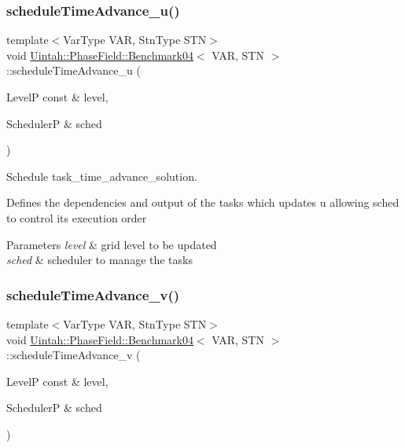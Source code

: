 \subsubsection{\texorpdfstring{schedule\+Time\+Advance\+\_\+u()}{scheduleTimeAdvance\_u()}}
{\footnotesize\ttfamily template$<$Var\+Type V\+AR, Stn\+Type S\+TN$>$ \\
void \hyperlink{classUintah_1_1PhaseField_1_1Benchmark04}{Uintah\+::\+Phase\+Field\+::\+Benchmark04}$<$ V\+AR, S\+TN $>$\+::schedule\+Time\+Advance\+\_\+u (\begin{DoxyParamCaption}\item[{LevelP const \&}]{level,  }\item[{SchedulerP \&}]{sched }\end{DoxyParamCaption})\hspace{0.3cm}{\ttfamily [protected]}}



Schedule task\+\_\+time\+\_\+advance\+\_\+solution. 

Defines the dependencies and output of the tasks which updates u allowing sched to control its execution order


\begin{DoxyParams}{Parameters}
{\em level} & grid level to be updated \\
\hline
{\em sched} & scheduler to manage the tasks \\
\hline
\end{DoxyParams}
\mbox{\label{classUintah_1_1PhaseField_1_1Benchmark04_af2af174a250e55c88d011aade126d709}} 
\subsubsection{\texorpdfstring{schedule\+Time\+Advance\+\_\+v()}{scheduleTimeAdvance\_v()}}
{\footnotesize\ttfamily template$<$Var\+Type V\+AR, Stn\+Type S\+TN$>$ \\
void \hyperlink{classUintah_1_1PhaseField_1_1Benchmark04}{Uintah\+::\+Phase\+Field\+::\+Benchmark04}$<$ V\+AR, S\+TN $>$\+::schedule\+Time\+Advance\+\_\+v (\begin{DoxyParamCaption}\item[{LevelP const \&}]{level,  }\item[{SchedulerP \&}]{sched }\end{DoxyParamCaption})\hspace{0.3cm}{\ttfamily [protected]}}



